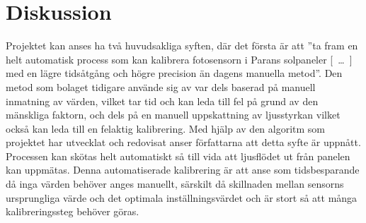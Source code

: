 \section{Diskussion} %
\label{sec:diskussion}

    Projektet kan anses ha två huvudsakliga syften, där det första är att ''ta fram en helt automatisk process som kan kalibrera fotosensorn i Parans solpaneler [~\dots~] med en lägre tidsåtgång och högre precision än dagens manuella metod''. 
    Den metod som bolaget tidigare använde sig av var dels baserad på manuell inmatning av värden, vilket tar tid och kan leda till fel på grund av den mänskliga faktorn, och dels på en manuell uppskattning av ljusstyrkan vilket också kan leda till en felaktig kalibrering. 
    Med hjälp av den algoritm som projektet har utvecklat och redovisat anser författarna att detta syfte är uppnått. Processen kan skötas helt automatiskt så till vida att ljusflödet ut från panelen kan uppmätas. 
    Denna automatiserade kalibrering är att anse som tidsbesparande då inga värden behöver anges manuellt, särskilt då skillnaden mellan sensorns ursprungliga värde och det optimala inställningsvärdet och är stort så att många kalibreringssteg behöver göras. \bigskip

